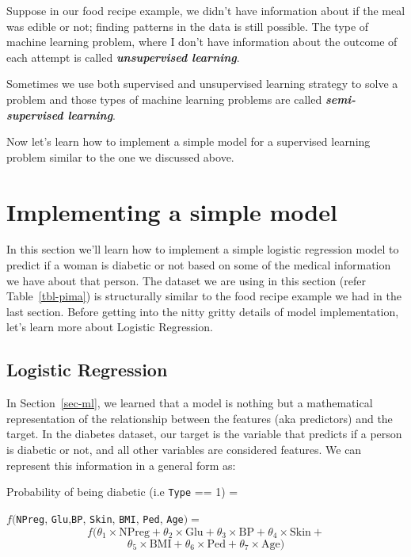 \documentclass[
  letterpaper,
]{book}
\begin{document}
Suppose in our food recipe example, we didn't have information about if
the meal was edible or not; finding patterns in the data is still
possible. The type of machine learning problem, where I don't have
information about the outcome of each attempt is called
\textbf{\emph{unsupervised learning}}.

Sometimes we use both supervised and unsupervised learning strategy to
solve a problem and those types of machine learning problems are called
\textbf{\emph{semi-supervised learning}}.

Now let's learn how to implement a simple model for a supervised
learning problem similar to the one we discussed above.

\hypertarget{implementing-a-simple-model}{%
\section{Implementing a simple
model}\label{implementing-a-simple-model}}

In this section we'll learn how to implement a simple logistic
regression model to predict if a woman is diabetic or not based on some
of the medical information we have about that person. The dataset we are
using in this section (refer Table~\ref{tbl-pima}) is structurally
similar to the food recipe example we had in the last section. Before
getting into the nitty gritty details of model implementation, let's
learn more about Logistic Regression.

\hypertarget{logistic-regression}{%
\subsection{Logistic Regression}\label{logistic-regression}}

In Section~\ref{sec-ml}, we learned that a model is nothing but a
mathematical representation of the relationship between the features
(aka predictors) and the target. In the diabetes dataset, our target is
the variable that predicts if a person is diabetic or not, and all other
variables are considered features. We can represent this information in
a general form as:

Probability of being diabetic (i.e \texttt{Type} == 1) =

\(f(\)\texttt{NPreg}, \texttt{Glu},\texttt{BP}, \texttt{Skin},
\texttt{BMI}, \texttt{Ped}, \texttt{Age}\() =\)
\[f(\theta_1 \times \text{NPreg} +
\theta_2 \times \text{Glu} +
\theta_3 \times \text{BP} +
\theta_4 \times \text{Skin} +
\] \[
\theta_5 \times \text{BMI} +
\theta_6 \times \text{Ped} +
\theta_7 \times \text{Age}) \tag{1}\]
\end{document}

